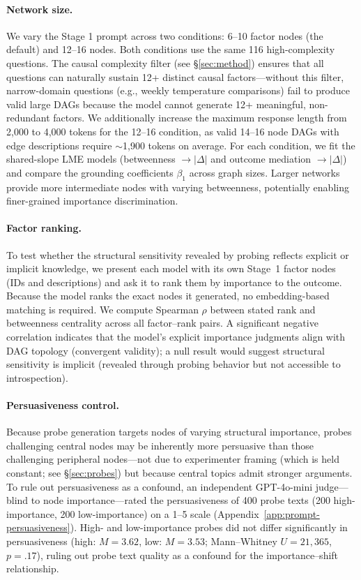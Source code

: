 \documentclass[11pt]{article}
\begin{document}
\paragraph{Network size.} We vary the Stage 1 prompt across two conditions: 6--10 factor nodes (the default) and 12--16 nodes. Both conditions use the same 116 high-complexity questions. The causal complexity filter (see \S\ref{sec:method}) ensures that all questions can naturally sustain 12+ distinct causal factors---without this filter, narrow-domain questions (e.g., weekly temperature comparisons) fail to produce valid large DAGs because the model cannot generate 12+ meaningful, non-redundant factors. We additionally increase the maximum response length from 2,000 to 4,000 tokens for the 12--16 condition, as valid 14--16 node DAGs with edge descriptions require ${\sim}$1,900 tokens on average. For each condition, we fit the shared-slope LME models (betweenness $\rightarrow |\Delta|$ and outcome mediation $\rightarrow |\Delta|$) and compare the grounding coefficients $\beta_1$ across graph sizes. Larger networks provide more intermediate nodes with varying betweenness, potentially enabling finer-grained importance discrimination.

\paragraph{Factor ranking.} To test whether the structural sensitivity revealed by probing reflects explicit or implicit knowledge, we present each model with its own Stage~1 factor nodes (IDs and descriptions) and ask it to rank them by importance to the outcome. Because the model ranks the exact nodes it generated, no embedding-based matching is required. We compute Spearman $\rho$ between stated rank and betweenness centrality across all factor--rank pairs. A significant negative correlation indicates that the model's explicit importance judgments align with DAG topology (convergent validity); a null result would suggest structural sensitivity is implicit (revealed through probing behavior but not accessible to introspection).

\paragraph{Persuasiveness control.} Because probe generation targets nodes of varying structural importance, probes challenging central nodes may be inherently more persuasive than those challenging peripheral nodes---not due to experimenter framing (which is held constant; see \S\ref{sec:probes}) but because central topics admit stronger arguments. To rule out persuasiveness as a confound, an independent GPT-4o-mini judge---blind to node importance---rated the persuasiveness of 400 probe texts (200 high-importance, 200 low-importance) on a 1--5 scale (Appendix~\ref{app:prompt-persuasiveness}). High- and low-importance probes did not differ significantly in persuasiveness (high: $M = 3.62$, low: $M = 3.53$; Mann--Whitney $U = 21{,}365$, $p = .17$), ruling out probe text quality as a confound for the importance--shift relationship.
\end{document}
